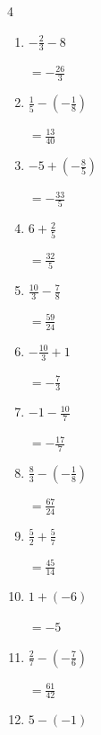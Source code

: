 \begin{multicols}{4}
\begin{enumerate}
        $\displaystyle =\frac{11}{10}$

  \item $\displaystyle -\frac{2}{3} - 8$

        $\displaystyle =-\frac{26}{3}$

  \item $\displaystyle \frac{1}{5} - \left(-\frac{1}{8}\right)$

        $\displaystyle =\frac{13}{40}$

  \item $\displaystyle -5 + \left(-\frac{8}{5}\right)$

        $\displaystyle =-\frac{33}{5}$

  \item $\displaystyle 6 + \frac{2}{5}$

        $\displaystyle =\frac{32}{5}$

\columnbreak %

\resetques

  \item $\displaystyle \frac{10}{3} - \frac{7}{8}$

        $\displaystyle =\frac{59}{24}$

  \item $\displaystyle -\frac{10}{3} + 1$

        $\displaystyle =-\frac{7}{3}$

  \item $\displaystyle -1 - \frac{10}{7}$

        $\displaystyle =-\frac{17}{7}$

  \item $\displaystyle \frac{8}{3} - \left(-\frac{1}{8}\right)$

        $\displaystyle =\frac{67}{24}$

  \item $\displaystyle \frac{5}{2} + \frac{5}{7}$

        $\displaystyle =\frac{45}{14}$

  \item $\displaystyle 1 + \left(-6\right)$

        $\displaystyle =-5$

  \item $\displaystyle \frac{2}{7} - \left(-\frac{7}{6}\right)$

        $\displaystyle =\frac{61}{42}$

  \item $\displaystyle 5 - \left(-1\right)$


\end{enumerate}
\end{multicols}
